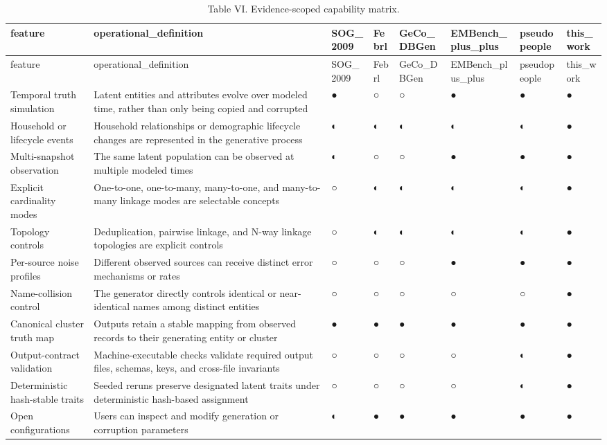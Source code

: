 \begin{longtable}{llllllll}
\caption{Table VI. Evidence-scoped capability matrix.}\\
\toprule
feature & operational\_definition & SOG\_2009 & Febrl & GeCo\_DBGen & EMBench\_plus\_plus & pseudopeople & this\_work \\
\midrule
\endfirsthead
\toprule
feature & operational\_definition & SOG\_2009 & Febrl & GeCo\_DBGen & EMBench\_plus\_plus & pseudopeople & this\_work \\
\midrule
\endhead
Temporal truth simulation & Latent entities and attributes evolve over modeled time, rather than only being copied and corrupted & ● & ○ & ○ & ● & ● & ● \\
Household or lifecycle events & Household relationships or demographic lifecycle changes are represented in the generative process & ◐ & ◐ & ◐ & ◐ & ◐ & ● \\
Multi-snapshot observation & The same latent population can be observed at multiple modeled times & ◐ & ○ & ○ & ● & ● & ● \\
Explicit cardinality modes & One-to-one, one-to-many, many-to-one, and many-to-many linkage modes are selectable concepts & ○ & ◐ & ◐ & ◐ & ◐ & ● \\
Topology controls & Deduplication, pairwise linkage, and N-way linkage topologies are explicit controls & ○ & ◐ & ◐ & ◐ & ◐ & ● \\
Per-source noise profiles & Different observed sources can receive distinct error mechanisms or rates & ○ & ○ & ○ & ● & ● & ● \\
Name-collision control & The generator directly controls identical or near-identical names among distinct entities & ○ & ○ & ○ & ○ & ○ & ● \\
Canonical cluster truth map & Outputs retain a stable mapping from observed records to their generating entity or cluster & ● & ● & ● & ● & ● & ● \\
Output-contract validation & Machine-executable checks validate required output files, schemas, keys, and cross-file invariants & ○ & ○ & ○ & ○ & ◐ & ● \\
Deterministic hash-stable traits & Seeded reruns preserve designated latent traits under deterministic hash-based assignment & ○ & ○ & ○ & ○ & ◐ & ● \\
Open configurations & Users can inspect and modify generation or corruption parameters & ◐ & ● & ● & ● & ● & ● \\
\bottomrule
\end{longtable}

